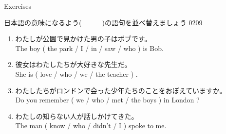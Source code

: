 \documentclass[aspectratio=169,xcolor={dvipsnames,table}]{beamer}
\begin{document}
\begin{frame}[plain]{Exercises}

{\small 日本語の意味になるよう(~~~~~~)の語句を並べ替えましょう}%
\hfill{\tiny 0209}\,{\scriptsize {}}
\begin{enumerate}
 \item わたしが公園で見かけた男の子はボブです。\\
       The boy ( the park / I / in / saw / who ) is Bob.\\
 \item 彼女はわたしたちが大好きな先生だ。\\
       She is ( love / who / we / the teacher ) .\\
 \item わたしたちがロンドンで会った少年たちのことをおぼえていますか。\\
       Do you remember ( we / who / met / the boys ) in London ?\\
 \item わたしの知らない人が話しかけてきた。\\
       The man ( know / who / didn't / I ) spoke to me.\\
\end{enumerate}
\end{frame}
\end{document}
